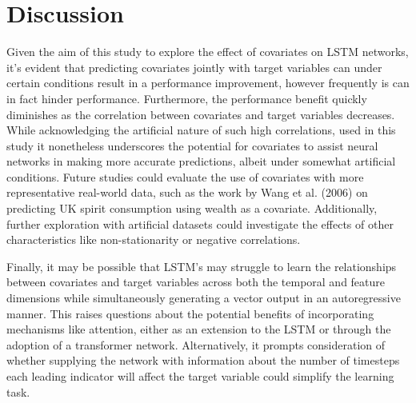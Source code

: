 \documentclass{article}
\newcommand{\pearson}{PCC}
\begin{document}
\section{Discussion}

Given the aim of this study to explore the effect of covariates on LSTM networks, it's evident that predicting covariates 
jointly with target variables can under certain conditions result in a performance improvement, however frequently is can in fact hinder performance. 
Furthermore, the performance benefit quickly diminishes as the correlation between covariates and target variables 
decreases.  While acknowledging the artificial nature of such high correlations, used in this study
it nonetheless underscores the potential for covariates to assist neural networks in making more accurate predictions, 
albeit under somewhat artificial conditions. Future studies could evaluate the use of covariates with more representative 
real-world data, such as the work by Wang et al. (2006) \cite{wang2006} on predicting UK spirit consumption using wealth as a covariate. 
Additionally, further exploration with artificial datasets could investigate the effects of other characteristics like 
non-stationarity or negative correlations.




Finally, it may be possible that LSTM's may struggle to learn the relationships between covariates and target variables 
across both the temporal and feature dimensions while simultaneously generating a vector output in an autoregressive 
manner. This raises questions about the potential benefits of incorporating mechanisms like attention, either as an 
extension to the LSTM or through the adoption of a transformer network. Alternatively, it prompts consideration of whether 
supplying the network with information about the number of timesteps each leading indicator will affect the target variable 
could simplify the learning task.




\end{document}
